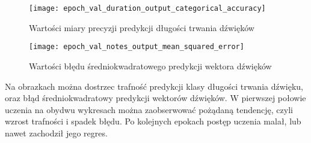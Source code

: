 {{        \begin{figure}
            \centering
            \texttt{[image: epoch\_val\_duration\_output\_categorical\_accuracy]}
            \caption{Wartości miary precyzji predykcji długości trwania dźwięków}
            \label{epoch_val_duration_output_categorical_accuracy}
        \end{figure}

        \begin{figure}
            \centering
            \texttt{[image: epoch\_val\_notes\_output\_mean\_squared\_error]}
            \caption{Wartości błędu średniokwadratowego predykcji wektora dźwięków}
            \label{epoch_val_notes_output_mean_squared_error}
        \end{figure}

        Na obrazkach można dostrzec trafność predykcji klasy długości trwania dźwięku, oraz błąd średniokwadratowy
        predykcji wektorów dźwięków. W pierwszej połowie uczenia na obydwu wykresach można zaobserwować pożądaną tendencję,
        czyli wzrost trafności i spadek błędu. Po kolejnych epokach postęp uczenia malał, lub nawet zachodził jego regres.
    }
}
